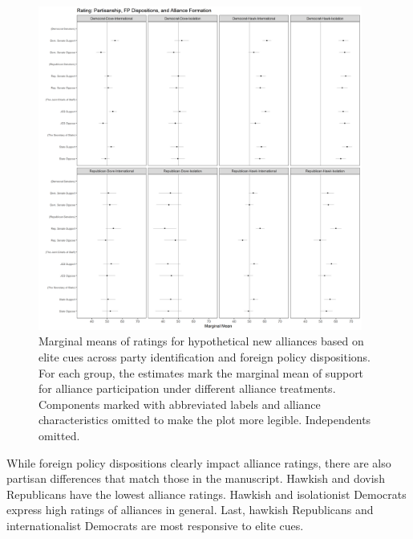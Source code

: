 \documentclass[12pt]{article}
\begin{document}
\begin{figure}[htpb]
	\centering
		\includegraphics[width=0.95\textwidth]{party-dispo-formapp.png}
	\caption{Marginal means of ratings for hypothetical new alliances based on elite cues across party identification and foreign policy dispositions. For each group, the estimates mark the marginal mean of support for alliance participation under different alliance treatments. Components marked with abbreviated labels and alliance characteristics omitted to make the plot more legible. Independents omitted.}
	\label{fig:party-dispo-form}
\end{figure}


While foreign policy dispositions clearly impact alliance ratings, there are also partisan differences that match those in the manuscript. 
Hawkish and dovish Republicans have the lowest alliance ratings. 
Hawkish and isolationist Democrats express high ratings of alliances in general.  
Last, hawkish Republicans and internationalist Democrats are most responsive to elite cues. 
\end{document}
